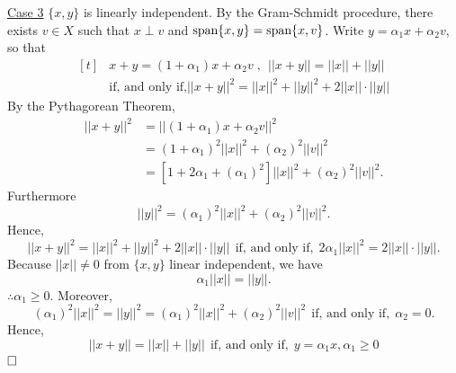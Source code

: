 \documentclass[letterpaper]{article}
\begin{document}
\begin{enumerate}
\underline{Case 3} $\{x, y\}$ is linearly independent. By the Gram-Schmidt procedure, there exists $v\in X$ such that $x \perp v$ and $\textrm{span} \{ x, y \} = \textrm{span} \{ x, v \}$. Write $y = \alpha_1x+\alpha_2v$, so that
$$\begin{aligned}[t]& x+y = (1+\alpha_1)x+\alpha_2 v\;, ~~ ||x+y|| = ||x||+||y||~~ \\ &\text{if, and only if,}
||x+y||^2 = ||x||^2+||y||^2+2||x||\cdot||y||\end{aligned}$$
By the Pythagorean Theorem,
$$\begin{aligned}||x+y||^2 &= ||(1+\alpha_1)x+\alpha_2v||^2\\
&= (1+\alpha_1)^2||x||^2+(\alpha_2)^2||v||^2\\
&= [1+2\alpha_1+(\alpha_1)^2]||x||^2 + (\alpha_2)^2||v||^2.\end{aligned}$$
Furthermore
$$||y||^2 = (\alpha_1)^2 ||x||^2 + (\alpha_2)^2 ||v||^2.$$
Hence,
$$||x+y||^2 = ||x||^2+||y||^2+2||x||\cdot||y||~~ \text{if, and only if,}~~ 2\alpha_1||x||^2 = 2||x||\cdot||y||.$$
Because $||x||\neq 0$ from $\{x, y\}$ linear independent, we have $$\alpha_1 ||x|| = ||y||.$$
$\therefore \alpha_1 \geq 0$. Moreover,
$$(\alpha_1)^2 ||x||^2 = ||y||^2 = (\alpha_1)^2 ||x||^2 + (\alpha_2)^2 ||v||^2~~ \text{if, and only if,}~~ \alpha_2 = 0.$$
Hence,
$$||x+y|| = ||x||+||y||~~ \text{if, and only if,}~~ y = \alpha_1 x, \alpha_1 \geq 0 $$ $\hfill \square$
\end{enumerate}
\end{document}
